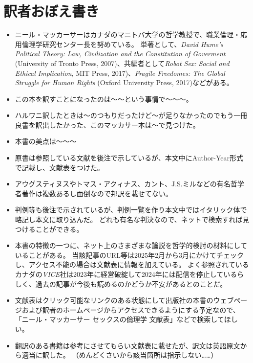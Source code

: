 \documentclass[paper=a4,book,openany]{jlreq} \usepackage{mystyle}
\begin{document}
\chapter*{訳者おぼえ書き}
{}
\begin{itemize}
\item ニール・マッカーサーはカナダのマニトバ大学の哲学教授で、職業倫理・応用倫理学研究センター長を努めている。
単著として、\emph{David Hume's Political Theory: Law, Civilization and the Constitution of Goverment} (University of Tronto Press, 2007)、共編者として\emph{Robot Sex: Social and Ethical Implication}, MIT Press, 2017)、\emph{Fragile Freedomes: The Global Struggle for Human Rights} (Oxford University Press, 2017)などがある。

\item この本を訳すことになったのは〜〜という事情で〜〜〜。

\item ハルワニ訳したときは〜のつもりだったけど〜が足りなかったのでもう一冊良書を訳出したかった、このマッカサー本は〜で見つけた。
\item 本書の美点は〜〜〜
\item 原書は参照している文献を後注で示しているが、本文中にAuthor-Year形式で記載し、文献表をつけた。
\item アウグスティヌスやトマス・アクィナス、カント、J.S.ミルなどの有名哲学者著作は複数あるし面倒なので邦訳を載せてない。
\item 判例等も後注で示されているが、判例一覧を作り本文中ではイタリック体で略記し本文に取り込んだ。
どれも有名な判決なので、ネットで検索すれば見つけることができる。
\item 本書の特徴の一つに、ネット上のさまざまな論説を哲学的検討の材料にしていることがある。
当該記事のURL等は2025年2月から3月にかけてチェックし、アクセス不能の場合は文献表に情報を加えている。
よく参照されているカナダの\emph{VICE}社は2023年に経営破綻して2024年には配信を停止しているらしく、過去の記事が今後も読めるのかどうか不安があるとのことだ。

\item 文献表はクリック可能なリンクのある状態にして出版社の本書のウェブページおよび訳者のホームページからアクセスできるようにする予定なので、「ニール・マッカーサー セックスの倫理学 文献表」などで検索してほしい。

\item 翻訳のある書籍は参考にさせてもらい文献表に載せたが、訳文は英語原文から適当に訳した。
（めんどくさいから該当箇所は指示しない……）


\end{itemize}
\end{document}
